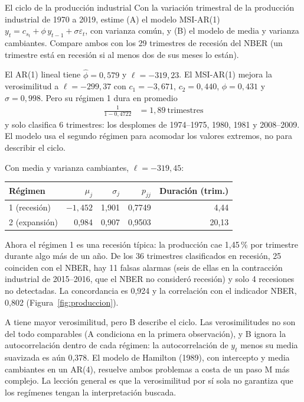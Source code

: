 \begin{ejresuelto}{El ciclo de la producción industrial}\label{ej:produccion}
\enunciado Con la variación trimestral de la producción industrial de 1970 a 2019, estime (A) el modelo MSI-AR(1)
$y_t=c_{s_t}+\phi\,y_{t-1}+\sigma\varepsilon_t$, con varianza común, y (B) el modelo de media y varianza cambiantes. Compare
ambos con los 29 trimestres de recesión del NBER (un trimestre está en recesión si al menos dos de sus meses lo están).

\solucion
{} El AR(1) lineal tiene $\hat\phi=0{,}579$ y $\ell=-319{,}23$. El MSI-AR(1) mejora la verosimilitud a
$\ell=-299{,}37$ con $c_1=-3{,}671$, $c_2=0{,}440$, $\phi=0{,}431$ y $\sigma=0{,}998$. Pero su régimen 1 dura en promedio
\begin{align*}
  \frac{1}{1-0{,}4722} &= 1{,}89\ \text{trimestres}
\end{align*}
y solo clasifica 6 trimestres: los desplomes de 1974--1975, 1980, 1981 y 2008--2009. El modelo usa el segundo régimen para
acomodar los valores extremos, no para describir el ciclo.

 Con media y varianza cambiantes, $\ell=-319{,}45$:
\begin{center}\small
\begin{tabular}{@{}lrrrr@{}}
\toprule
Régimen & $\mu_j$ & $\sigma_j$ & $p_{jj}$ & Duración (trim.) \\
\midrule
1 (recesión) & $-1{,}452$ & 1,901 & 0,7749 & 4,44 \\
2 (expansión) & 0,984 & 0,907 & 0,9503 & 20,13 \\
\bottomrule
\end{tabular}
\end{center}
Ahora el régimen 1 es una recesión típica: la producción cae 1,45\,\% por trimestre durante algo más de un año. De los 36 trimestres
clasificados en recesión, 25 coinciden con el NBER, hay 11 falsas alarmas (seis de ellas en la contracción industrial de 2015--2016,
que el NBER no consideró recesión) y solo 4 recesiones no detectadas. La concordancia es 0,924 y la correlación con el indicador
NBER, 0,802 (Figura~\ref{fig:produccion}).

 A tiene mayor verosimilitud, pero B describe el ciclo. Las verosimilitudes no son del todo
comparables (A condiciona en la primera observación), y B ignora la autocorrelación dentro de cada régimen: la
autocorrelación de $y_t$ menos su media suavizada es aún 0,378. El modelo de Hamilton (1989), con intercepto y media cambiantes
en un AR(4), resuelve ambos problemas a costa de un paso M más complejo. La lección general es que la verosimilitud por sí sola
no garantiza que los regímenes tengan la interpretación buscada.


\end{ejresuelto}
